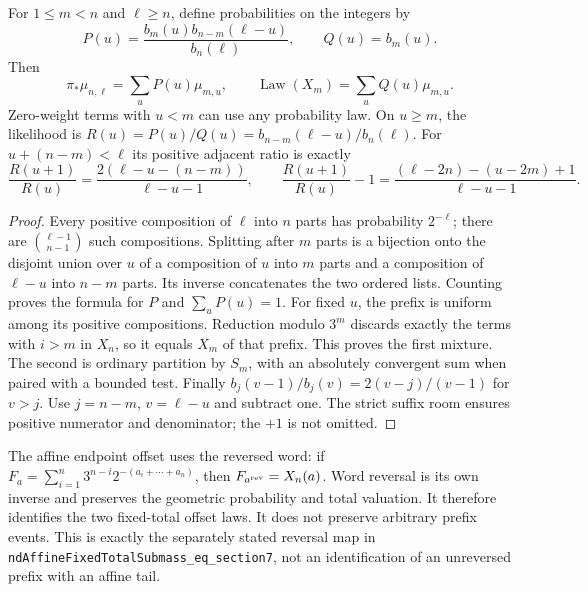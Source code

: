 \begin{proposition}
\label{prop:Mazur-prefix-mixture}
For $1\le m<n$ and $\ell\ge n$, define probabilities on the integers by
\[
 P(u)=\frac{b_m(u)b_{n-m}(\ell-u)}{b_n(\ell)},\qquad Q(u)=b_m(u).
\]
Then
\begin{equation}
 \pi_*\mu_{n,\ell}=\sum_uP(u)\mu_{m,u},\qquad
 \operatorname{Law}(X_m)=\sum_uQ(u)\mu_{m,u}.
 \label{eq:Mazur-prefix-mixture}
\end{equation}
Zero-weight terms with $u<m$ can use any probability law.
On $u\ge m$, the likelihood is
$R(u)=P(u)/Q(u)=b_{n-m}(\ell-u)/b_n(\ell)$.
For $u+(n-m)<\ell$ its positive adjacent ratio is exactly
\begin{equation}
 \frac{R(u+1)}{R(u)}
 =\frac{2(\ell-u-(n-m))}{\ell-u-1},\qquad
 \frac{R(u+1)}{R(u)}-1
 =\frac{(\ell-2n)-(u-2m)+1}{\ell-u-1}.
 \label{eq:Mazur-adjacent-ratio}
\end{equation}
\end{proposition}
\begin{proof}
Every positive composition of $\ell$ into $n$ parts has probability
$2^{-\ell}$; there are $\binom{\ell-1}{n-1}$ such compositions.
Splitting after $m$ parts is a bijection onto the disjoint union over $u$
of a composition of $u$ into $m$ parts and a composition of $\ell-u$
into $n-m$ parts. Its inverse concatenates the two ordered lists.
Counting proves the formula for $P$ and $\sum_uP(u)=1$.
For fixed $u$, the prefix is uniform among its positive compositions.
Reduction modulo $3^m$ discards exactly the terms with $i>m$ in $X_n$,
so it equals $X_m$ of that prefix. This proves the first mixture.
The second is ordinary partition by $S_m$, with an absolutely
convergent sum when paired with a bounded test.
Finally
$b_j(v-1)/b_j(v)=2(v-j)/(v-1)$ for $v>j$.
Use $j=n-m$, $v=\ell-u$ and subtract one. The strict suffix room
ensures positive numerator and denominator; the $+1$ is not omitted.
\end{proof}

The affine endpoint offset uses the reversed word: if
$F_a=\sum_{i=1}^n3^{n-i}2^{-(a_i+\cdots+a_n)}$, then
$F_{a^{\rm rev}}=X_n(a)$. Word reversal is its own inverse and preserves
the geometric probability and total valuation. It therefore identifies
the two fixed-total offset laws. It does not preserve arbitrary prefix
events. This is exactly the separately stated reversal map in
\texttt{ndAffineFixedTotalSubmass\_eq\_section7}, not an identification
of an unreversed prefix with an affine tail.

